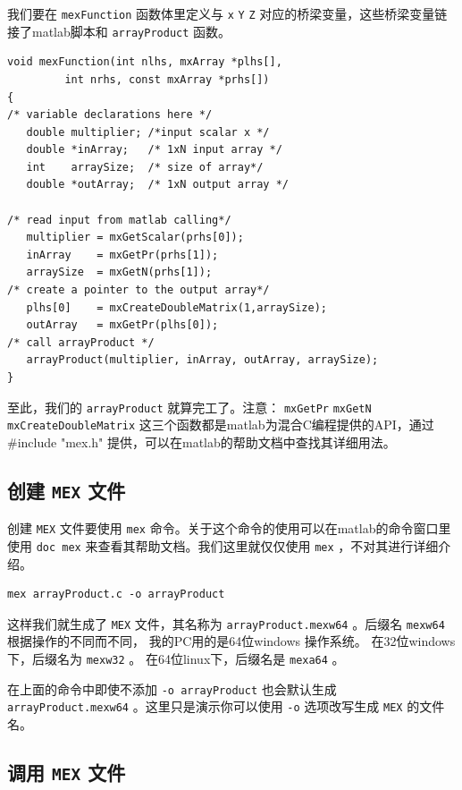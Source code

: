 \documentclass[10pt,a4paper,UTF8]{article}
\begin{document}
我们要在 \texttt{mexFunction} 函数体里定义与 \texttt{x} \texttt{Y} \texttt{Z} 对应的桥梁变量，这些桥梁变量链接了matlab脚本和 \texttt{arrayProduct} 函数。
\lstset{language=C,label= ,caption= ,captionpos=b,numbers=none}
\begin{lstlisting}
void mexFunction(int nlhs, mxArray *plhs[],
		 int nrhs, const mxArray *prhs[])
{
/* variable declarations here */
   double multiplier; /*input scalar x */
   double *inArray;   /* 1xN input array */
   int    arraySize;  /* size of array*/
   double *outArray;  /* 1xN output array */

/* read input from matlab calling*/
   multiplier = mxGetScalar(prhs[0]);
   inArray    = mxGetPr(prhs[1]);
   arraySize  = mxGetN(prhs[1]);
/* create a pointer to the output array*/
   plhs[0]    = mxCreateDoubleMatrix(1,arraySize);
   outArray   = mxGetPr(plhs[0]);
/* call arrayProduct */
   arrayProduct(multiplier, inArray, outArray, arraySize);
}
\end{lstlisting}

至此，我们的 \texttt{arrayProduct} 就算完工了。注意： \texttt{mxGetPr} \texttt{mxGetN} \texttt{mxCreateDoubleMatrix} 这三个函数都是matlab为混合C编程提供的API，通过 \#include "mex.h" 提供，可以在matlab的帮助文档中查找其详细用法。
\subsection{创建 \texttt{MEX} 文件}
\label{sec:orgheadline5}


创建 \texttt{MEX} 文件要使用 \texttt{mex} 命令。关于这个命令的使用可以在matlab的命令窗口里使用 \texttt{doc mex} 来查看其帮助文档。我们这里就仅仅使用 \texttt{mex} ，不对其进行详细介绍。
\lstset{language=matlab,label= ,caption= ,captionpos=b,numbers=none}
\begin{lstlisting}
mex arrayProduct.c -o arrayProduct
\end{lstlisting}
这样我们就生成了 \texttt{MEX} 文件，其名称为 \texttt{arrayProduct.mexw64} 。后缀名 \texttt{mexw64} 根据操作的不同而不同， 我的PC用的是64位windows 操作系统。 在32位windows下，后缀名为 \texttt{mexw32} 。 在64位linux下，后缀名是 \texttt{mexa64} 。

在上面的命令中即使不添加 \texttt{-o arrayProduct} 也会默认生成 \texttt{arrayProduct.mexw64} 。这里只是演示你可以使用 \texttt{-o} 选项改写生成 \texttt{MEX} 的文件名。
\subsection{调用 \texttt{MEX} 文件}
\label{sec:orgheadline6}
\end{document}
